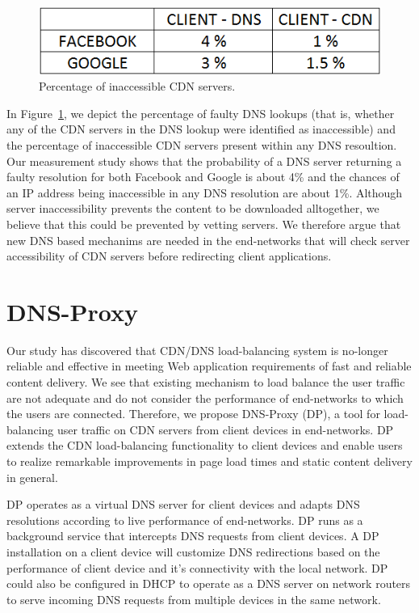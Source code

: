 \documentclass{llncs}
\begin{document}
\begin{figure}
\centering
{}
  \includegraphics[width=\linewidth]{figures/bad_ip_percentage}
  \caption{Percentage of inaccessible CDN servers.}
  \label{table:bad_ip_percentage}
\endminipage
\end{figure}

In Figure~\ref{table:bad_ip_percentage}, we depict the percentage of faulty DNS lookups (that is, whether any of the CDN servers in the DNS lookup were identified as inaccessible) and the percentage of inaccessible CDN servers present within any DNS resoultion.
Our measurement study shows that the probability of a DNS server returning a faulty resolution for both Facebook and Google is about 4\% and the chances of an IP address being inaccessible in any DNS resolution are about 1\%.
Although server inaccessibility prevents the content to be downloaded alltogether, we believe that this could be prevented by vetting servers.
We therefore argue that new DNS based mechanims are needed in the end-networks that will check server accessibility of CDN servers before redirecting client applications.


\section{DNS-Proxy}
\label{methodology}

Our study has discovered that CDN/DNS load-balancing system is no-longer reliable and effective in meeting Web application requirements of fast and reliable content delivery.
We see that existing mechanism to load balance the user traffic are not adequate and do not consider the performance of end-networks to which the users are connected.
Therefore, we propose DNS-Proxy (DP), a tool for load-balancing user traffic on CDN servers from client devices in end-networks.
DP extends the CDN load-balancing functionality to client devices and enable users to realize remarkable improvements in page load times and static content delivery in general.

DP operates as a virtual DNS server for client devices and adapts DNS resolutions according to live performance of end-networks.
DP runs as a background service that intercepts DNS requests from client devices. 
A DP installation on a client device will customize DNS redirections based on the performance of client device and it's connectivity with the local network.
DP could also be configured in DHCP to operate as a DNS server on network routers to serve incoming DNS requests from multiple devices in the same network.
\end{document}
